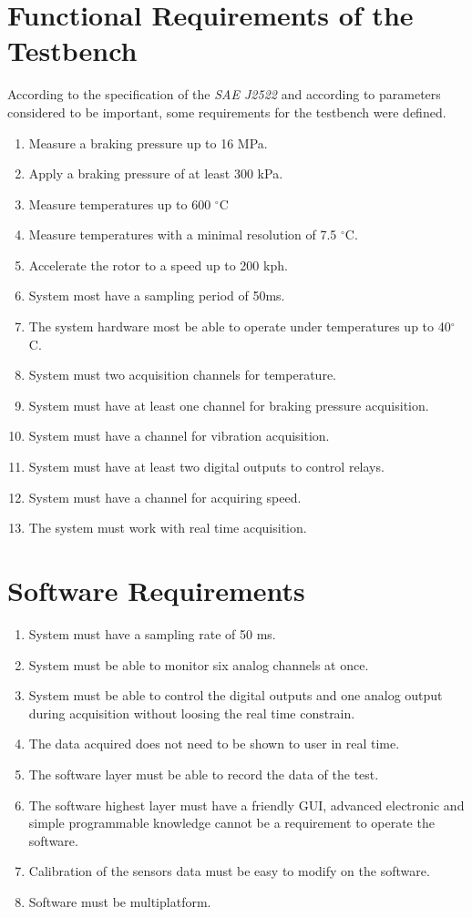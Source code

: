 \section{Functional Requirements of the Testbench}\label{sec:functionalRequirements}

	According to the specification of the \textit{SAE J2522} and according to parameters considered to be important, some requirements for the testbench were defined.

	\begin{enumerate}
		\item Measure a braking pressure up to 16 MPa.
		\item Apply a braking pressure of at least 300 kPa.
		\item Measure temperatures up to 600 $^{\circ}$C
		\item Measure temperatures with a minimal resolution of 7.5 $^{\circ}$C.
		\item Accelerate the rotor to a speed up to 200 kph.
		\item System most have a sampling period of 50ms.
		\item The system hardware most be able to operate under temperatures up to 40$^{\circ}$C.
		\item System must two acquisition channels for temperature.
		\item System must have at least one channel for braking pressure acquisition.
		\item System must have a channel for vibration acquisition.
		\item System must have at least two digital outputs to control relays.
		\item System must have a channel for acquiring speed.
		\item The system must work with real time acquisition.
	\end{enumerate}
	
\section{Software Requirements}
	
	\begin{enumerate}
		\item System must have a sampling rate of 50 ms.
		\item System must be able to monitor six analog channels at once.
		\item System must be able to control the digital outputs and one analog output during acquisition without loosing the real time constrain.
		\item The data acquired does not need to be shown to user in real time.
		\item The software layer must be able to record the data of the test.
		\item The software highest layer must have a friendly GUI, advanced electronic and simple programmable knowledge cannot be a requirement to operate the software.
		\item Calibration of the sensors data must be easy to modify on the software.
		\item Software must be multiplatform.
	\end{enumerate}
